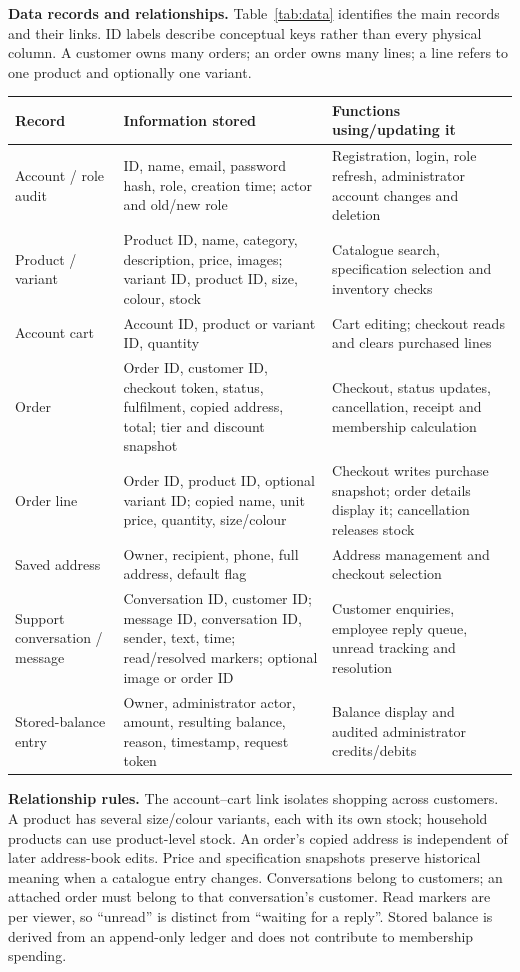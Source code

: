 \newpage
\textbf{Data records and relationships.} Table~\ref{tab:data} identifies the main records and their links. ID labels describe conceptual keys rather than every physical column. A customer owns many orders; an order owns many lines; a line refers to one product and optionally one variant.
\begin{center}
\small
\begin{tabularx}{\linewidth}{|p{27mm}|Y|Y|}\hline
\textbf{Record}&\textbf{Information stored}&\textbf{Functions using/updating it}\\\hline
Account / role audit&ID, name, email, password hash, role, creation time; actor and old/new role&Registration, login, role refresh, administrator account changes and deletion\\\hline
Product / variant&Product ID, name, category, description, price, images; variant ID, product ID, size, colour, stock&Catalogue search, specification selection and inventory checks\\\hline
Account cart&Account ID, product or variant ID, quantity&Cart editing; checkout reads and clears purchased lines\\\hline
Order&Order ID, customer ID, checkout token, status, fulfilment, copied address, total; tier and discount snapshot&Checkout, status updates, cancellation, receipt and membership calculation\\\hline
Order line&Order ID, product ID, optional variant ID; copied name, unit price, quantity, size/colour&Checkout writes purchase snapshot; order details display it; cancellation releases stock\\\hline
Saved address&Owner, recipient, phone, full address, default flag&Address management and checkout selection\\\hline
Support conversation / message&Conversation ID, customer ID; message ID, conversation ID, sender, text, time; read/resolved markers; optional image or order ID&Customer enquiries, employee reply queue, unread tracking and resolution\\\hline
Stored-balance entry&Owner, administrator actor, amount, resulting balance, reason, timestamp, request token&Balance display and audited administrator credits/debits\\\hline
\end{tabularx}
\label{tab:data}
\end{center}

\textbf{Relationship rules.} The account--cart link isolates shopping across customers. A product has several size/colour variants, each with its own stock; household products can use product-level stock. An order's copied address is independent of later address-book edits. Price and specification snapshots preserve historical meaning when a catalogue entry changes. Conversations belong to customers; an attached order must belong to that conversation's customer. Read markers are per viewer, so ``unread'' is distinct from ``waiting for a reply''. Stored balance is derived from an append-only ledger and does not contribute to membership spending.

